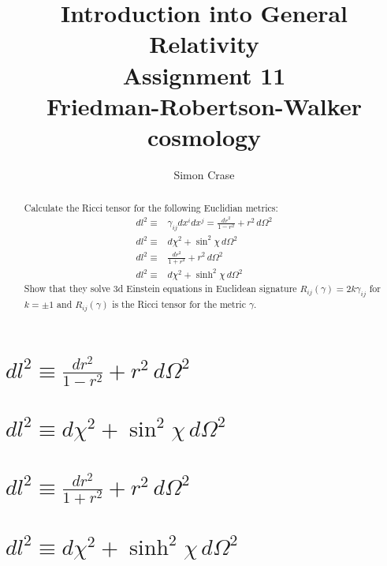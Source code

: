 \documentclass[]{article}
\title{Introduction into General Relativity\\Assignment 11\\Friedman-Robertson-Walker cosmology}
\author{Simon Crase}
\begin{document}
\maketitle

\begin{abstract}
Calculate the Ricci tensor for the following Euclidian metrics:
\begin{align*}
dl^2\equiv&\gamma_{ij}dx^idx^j=\frac{dr^2}{1-r^2}+r^2\,d\Omega^2\\
dl^2\equiv&d\chi^2+\sin^2 \chi\,d\Omega^2\\
dl^2\equiv&\frac{dr^2}{1+r^2}+r^2\,d\Omega^2\\
dl^2\equiv&d\chi^2+\sinh^2 \chi\,d\Omega^2
\end{align*}
Show that they solve 3d Einstein equations in Euclidean signature $R_{ij}(\gamma)=2k\gamma_{ij}$ for $k=\pm 1$ and $R_{ij}(\gamma)$ is the Ricci tensor for the metric $\gamma$.
\end{abstract}

\tableofcontents

\section{$dl^2\equiv\frac{dr^2}{1-r^2}+r^2\,d\Omega^2$}
\section{$dl^2\equiv d\chi^2+\sin^2 \chi\,d\Omega^2$}
\section{$dl^2\equiv\frac{dr^2}{1+r^2}+r^2\,d\Omega^2$}
\section{$dl^2\equiv d\chi^2+\sinh^2 \chi\,d\Omega^2$}
\end{document}
